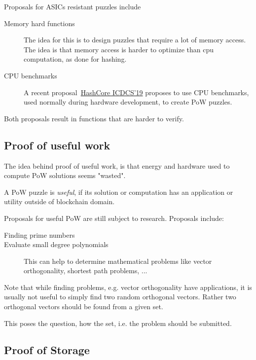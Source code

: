 \begin{note}
	Proposals for ASICs resistant puzzles include
	\begin{description}
		\item[Memory hard functions] The idea for this is to design puzzles that require a lot of memory access. The idea is that memory access is harder to optimize than cpu computation, as done for hashing.
		\item[CPU benchmarks] A recent proposal~\href{https://conferences.computer.org/icdcs/2019/pdfs/ICDCS2019-49XpIlu3rRtYi2T0qVYnNX/7v1qCHBMZ7kt9TX7Q7GlHe/6ND9kaBwjCCoPVJQvvyQ81.pdf}{HashCore ICDCS'19} proposes to use CPU benchmarks, used normally during hardware development, to create PoW puzzles.
	\end{description}
Both proposals result in functions that are harder to verify.
\end{note}

\subsection{Proof of useful work}
The idea behind proof of useful work, is that energy and hardware used to compute PoW solutions seems "wasted".

\begin{definition} A PoW puzzle is \emph{useful}, if its solution or computation has an application or utility outside of blockchain domain.
\end{definition}

\begin{note} Proposals for useful PoW are still subject to research. Proposals include:
	\begin{description}
		\item[Finding prime numbers]
		\item[Evaluate small degree polynomials] This can help to determine mathematical problems like vector orthogonality, shortest path problems, ...
	\end{description}

Note that while finding problems, e.g. vector orthogonality have applications, it is usually not useful to simply find two random orthogonal vectors. Rather two orthogonal vectors should be found from a given set. 

This poses the question, how the set, i.e. the problem should be submitted.
\end{note}


\subsection{Proof of Storage}


